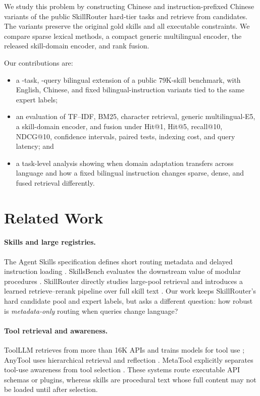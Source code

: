 \documentclass[letterpaper]{article}
\begin{document}
We study this problem by constructing
Chinese and instruction-prefixed Chinese variants of the public SkillRouter
hard-tier tasks
and retrieve from \PublicSkillCount{} candidates.  The variants preserve the
original gold skills and all executable constraints.  We compare sparse
lexical methods, a compact generic multilingual encoder, the released
skill-domain encoder, and rank fusion.

Our contributions are:
\begin{itemize}
  \item a \PublicTaskCount{}-task, \PublicVariantCount{}-query bilingual
  extension of a public 79K-skill benchmark, with English, Chinese, and
  fixed bilingual-instruction variants tied to the same expert labels;
  \item an evaluation of TF--IDF, BM25, character retrieval, generic
  multilingual-E5, a skill-domain encoder, and fusion under Hit@1, Hit@5,
  recall@10, NDCG@10, confidence intervals, paired tests, indexing cost, and
  query latency; and
  \item a task-level analysis showing when domain adaptation transfers across
  language and how a fixed bilingual instruction changes sparse, dense, and
  fused retrieval differently.
\end{itemize}

\section{Related Work}

\paragraph{Skills and large registries.}
The Agent Skills specification defines short routing metadata and delayed
instruction loading \cite{agentskills2025spec}.  SkillsBench evaluates the
downstream value of modular procedures \cite{li2026skillsbench}.  SkillRouter
directly studies large-pool retrieval and introduces a learned
retrieve--rerank pipeline over full skill text \cite{zheng2026skillrouter}.
Our work keeps SkillRouter's hard candidate pool and expert labels, but asks a
different question: how robust is \emph{metadata-only} routing when queries
change language?

\paragraph{Tool retrieval and awareness.}
ToolLLM retrieves from more than 16K APIs and trains models for tool use
\cite{qin2024toolllm}; AnyTool uses hierarchical retrieval and reflection
\cite{du2024anytool}.  MetaTool explicitly separates tool-use awareness from
tool selection \cite{huang2024metatool}.  These systems route executable API
schemas or plugins, whereas skills are procedural text whose full content may
not be loaded until after selection.
\end{document}
